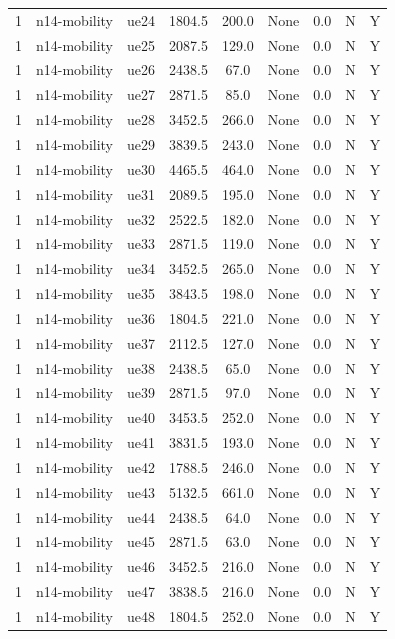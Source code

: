 \begin{table}[ht]
\begin{tabular}{|c|c|c|c|c|c|c|c|c|}
1 & n14-mobility & ue24 & 1804.5 & 200.0 & None & 0.0 & N & Y \\
1 & n14-mobility & ue25 & 2087.5 & 129.0 & None & 0.0 & N & Y \\
1 & n14-mobility & ue26 & 2438.5 & 67.0 & None & 0.0 & N & Y \\
1 & n14-mobility & ue27 & 2871.5 & 85.0 & None & 0.0 & N & Y \\
1 & n14-mobility & ue28 & 3452.5 & 266.0 & None & 0.0 & N & Y \\
1 & n14-mobility & ue29 & 3839.5 & 243.0 & None & 0.0 & N & Y \\
1 & n14-mobility & ue30 & 4465.5 & 464.0 & None & 0.0 & N & Y \\
1 & n14-mobility & ue31 & 2089.5 & 195.0 & None & 0.0 & N & Y \\
1 & n14-mobility & ue32 & 2522.5 & 182.0 & None & 0.0 & N & Y \\
1 & n14-mobility & ue33 & 2871.5 & 119.0 & None & 0.0 & N & Y \\
1 & n14-mobility & ue34 & 3452.5 & 265.0 & None & 0.0 & N & Y \\
1 & n14-mobility & ue35 & 3843.5 & 198.0 & None & 0.0 & N & Y \\
1 & n14-mobility & ue36 & 1804.5 & 221.0 & None & 0.0 & N & Y \\
1 & n14-mobility & ue37 & 2112.5 & 127.0 & None & 0.0 & N & Y \\
1 & n14-mobility & ue38 & 2438.5 & 65.0 & None & 0.0 & N & Y \\
1 & n14-mobility & ue39 & 2871.5 & 97.0 & None & 0.0 & N & Y \\
1 & n14-mobility & ue40 & 3453.5 & 252.0 & None & 0.0 & N & Y \\
1 & n14-mobility & ue41 & 3831.5 & 193.0 & None & 0.0 & N & Y \\
1 & n14-mobility & ue42 & 1788.5 & 246.0 & None & 0.0 & N & Y \\
1 & n14-mobility & ue43 & 5132.5 & 661.0 & None & 0.0 & N & Y \\
1 & n14-mobility & ue44 & 2438.5 & 64.0 & None & 0.0 & N & Y \\
1 & n14-mobility & ue45 & 2871.5 & 63.0 & None & 0.0 & N & Y \\
1 & n14-mobility & ue46 & 3452.5 & 216.0 & None & 0.0 & N & Y \\
1 & n14-mobility & ue47 & 3838.5 & 216.0 & None & 0.0 & N & Y \\
1 & n14-mobility & ue48 & 1804.5 & 252.0 & None & 0.0 & N & Y \\

\end{tabular}
\end{table}
